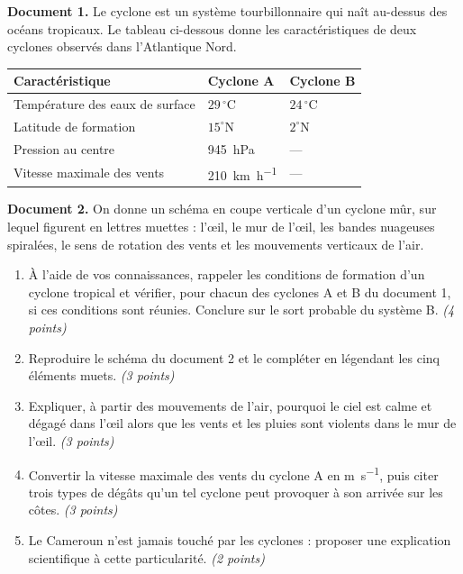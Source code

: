 \documentclass[11pt]{article}
\begin{document}
\begin{exercice}
\textbf{Document 1.} Le cyclone est un système tourbillonnaire qui naît au-dessus des océans tropicaux. Le tableau ci-dessous donne les caractéristiques de deux cyclones observés dans l'Atlantique Nord.

\begin{center}
\begin{tabularx}{\linewidth}{|l|X|X|}
\hline
\rowcolor{popblueL} \textbf{Caractéristique} & \textbf{Cyclone A} & \textbf{Cyclone B} \\
\hline
Température des eaux de surface & $29\,^\circ$C & $24\,^\circ$C \\
\hline
Latitude de formation & $15^\circ$N & $2^\circ$N \\
\hline
Pression au centre & \SI{945}{hPa} & --- \\
\hline
Vitesse maximale des vents & \SI{210}{km.h^{-1}} & --- \\
\hline
\end{tabularx}
\end{center}

\textbf{Document 2.} On donne un schéma en coupe verticale d'un cyclone mûr, sur lequel figurent en lettres muettes : l'\oe il, le mur de l'\oe il, les bandes nuageuses spiralées, le sens de rotation des vents et les mouvements verticaux de l'air.

\begin{enumerate}
\item À l'aide de vos connaissances, rappeler les conditions de formation d'un cyclone tropical et vérifier, pour chacun des cyclones A et B du document 1, si ces conditions sont réunies. Conclure sur le sort probable du système B. \emph{(4 points)}
\item Reproduire le schéma du document 2 et le compléter en légendant les cinq éléments muets. \emph{(3 points)}
\item Expliquer, à partir des mouvements de l'air, pourquoi le ciel est calme et dégagé dans l'\oe il alors que les vents et les pluies sont violents dans le mur de l'\oe il. \emph{(3 points)}
\item Convertir la vitesse maximale des vents du cyclone A en \si{m.s^{-1}}, puis citer trois types de dégâts qu'un tel cyclone peut provoquer à son arrivée sur les côtes. \emph{(3 points)}
\item Le Cameroun n'est jamais touché par les cyclones : proposer une explication scientifique à cette particularité. \emph{(2 points)}
\end{enumerate}
\end{exercice}
\end{document}
